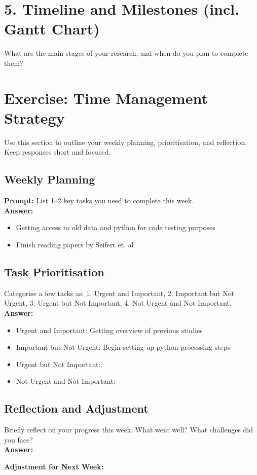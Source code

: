 \documentclass[a4paper,12pt]{article}
\begin{document}
\section{5. Timeline and Milestones (incl. Gantt Chart)}
What are the main stages of your research, and when do you plan to complete them?\\

\section{Exercise: Time Management Strategy}
Use this section to outline your weekly planning, prioritisation, and reflection. Keep responses short and focused.

\subsection*{Weekly Planning}
\textbf{Prompt:} List 1–2 key tasks you need to complete this week.\\
\textbf{Answer:}
\begin{itemize}
    \item Getting access to old data and python for code testing purposes
    \item Finish reading papers by Seifert et. al
\end{itemize}

\subsection*{Task Prioritisation}
 Categorise a few tasks as: 1. Urgent and Important, 2. Important but Not Urgent, 3. Urgent but Not Important, 4. Not Urgent and Not Important.\\
\textbf{Answer:}
\begin{itemize}
    \item Urgent and Important: Getting overview of previous studies
    \item Important but Not Urgent: Begin setting up python processing steps
    \item Urgent but Not Important: 
    \item Not Urgent and Not Important: 
\end{itemize}

\subsection*{Reflection and Adjustment}
Briefly reflect on your progress this week. What went well? What challenges did you face?\\
\textbf{Answer:} 

\noindent
\textbf{Adjustment for Next Week:} 
\end{document}
